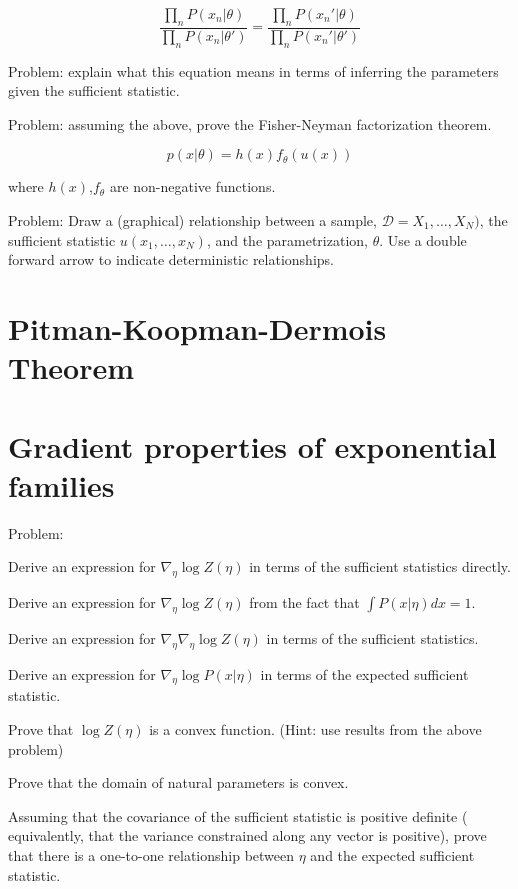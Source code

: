 \documentclass[a4paper]{article}
\begin{document}
\begin{equation}
  \frac{\prod_n P(x_n \vert \theta) }{ \prod_n P( x_n \vert \theta') } = \frac{\prod_n P( x_n' \vert \theta) }{ \prod_n P( x_n' \vert \theta') }
  \label{}
\end{equation}

Problem: explain what this equation means in terms of inferring the parameters given the sufficient statistic.

Problem: assuming the above, prove the Fisher-Neyman factorization theorem.

\begin{equation}
  p(x \vert \theta) = h(x) f_\theta( u(x) )
  \label{Fisher-Neyman factorization theorem}
\end{equation}

where $h(x)$,$f_\theta$ are non-negative functions.

Problem: 
Draw a (graphical) relationship between a sample, $\mathcal{D} = X_1,\ldots,X_N)$, the sufficient statistic $u(x_1, \ldots, x_N)$, and the parametrization, $\theta$.  
Use a double forward arrow to indicate deterministic relationships.

\section{Pitman-Koopman-Dermois Theorem}

\section{Gradient properties of exponential families}

Problem:

Derive an expression for $ \nabla_\eta \log Z(\eta) $ in terms of the sufficient statistics directly.

Derive an expression for $ \nabla_\eta \log Z(\eta) $ from the fact that $ \int P( x \vert \eta) dx = 1 $.

Derive an expression for $ \nabla_\eta \nabla_\eta \log Z(\eta) $ in terms of the sufficient statistics.

Derive an expression for $ \nabla_\eta \log P( x \vert \eta ) $ in terms of the expected sufficient statistic.

Prove that $ \log Z(\eta)$ is a convex function.
(Hint: use results from the above problem)

Prove that the domain of natural parameters is convex.

Assuming that the covariance of the sufficient statistic is positive definite ( equivalently, that the variance constrained along any vector is positive), prove that there is a one-to-one relationship between $\eta$ and the expected sufficient statistic.
\end{document}

